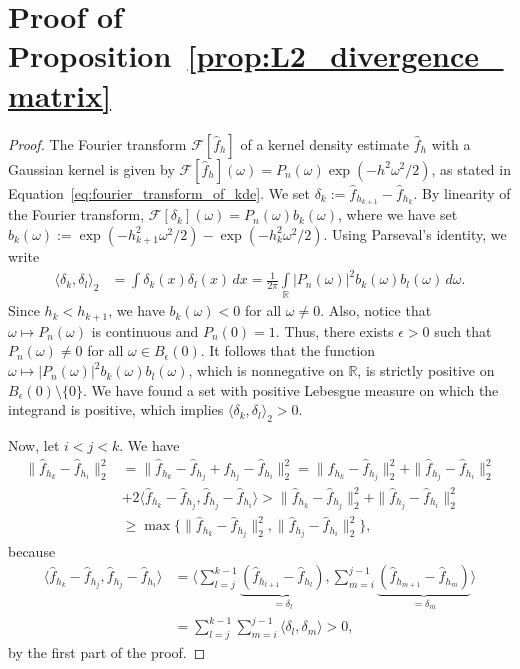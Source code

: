 \section{Proof of Proposition~\ref{prop:L2_divergence_matrix}}\label{sec:proof_L2_divergence_matrix}

\begin{proof}
    The Fourier transform $\mathcal{F}[\hat{f}_h]$ of a kernel density estimate $\hat{f}_h$ with a Gaussian kernel is given by $\mathcal{F}[\hat{f}_h](\omega)=P_n(\omega)\exp{(-h^2\omega^2/2)}$, as stated in Equation~\eqref{eq:fourier_transform_of_kde}. We set $\delta_k:=\hat{f}_{h_{k+1}}-\hat{f}_{h_k}$. By linearity of the Fourier transform, $\mathcal{F}[\delta_k](\omega)=P_n(\omega)b_k(\omega)$, where we have set $b_k(\omega):=\exp{(-h_{k+1}^2\omega^2/2)}-\exp{(-h_k^2\omega^2/2)}$. Using Parseval's identity, we write
    \begin{align*}
        \langle\delta_k,\delta_l\rangle_2&=\int\delta_k(x)\delta_l(x)\,dx=\frac{1}{2\pi}\int\limits_{\mathbb{R}}|P_n(\omega)|^2b_k(\omega)b_l(\omega)\,d\omega.
    \end{align*}
    Since $h_k<h_{k+1}$, we have $b_k(\omega)<0$ for all $\omega\ne0$. Also, notice that $\omega\mapsto P_n(\omega)$ is continuous and $P_n(0)=1$. Thus, there exists $\epsilon>0$ such that $P_n(\omega)\ne0$ for all $\omega\in B_{\epsilon}(0)$. It follows that the function $\omega\mapsto|P_n(\omega)|^2b_k(\omega)b_l(\omega)$, which is nonnegative on $\mathbb{R}$, is strictly positive on $B_{\epsilon}(0)\setminus\{0\}$. We have found a set with positive Lebesgue measure on which the integrand is positive, which implies $\langle\delta_k,\delta_l\rangle_2>0$.

    Now, let $i<j<k$. We have
    \begin{align*}
        \|\hat{f}_{h_k}-\hat{f}_{h_i}\|_2^2&=\|\hat{f}_{h_k}-\hat{f}_{h_j}+\hat{f}_{h_j}-\hat{f}_{h_i}\|_2^2=\|\hat{f}_{h_k}-\hat{f}_{h_j}\|_2^2+\|\hat{f}_{h_j}-\hat{f}_{h_i}\|_2^2\\&
        +2\langle\hat{f}_{h_k}-\hat{f}_{h_j},\hat{f}_{h_j}-\hat{f}_{h_i}\rangle>\|\hat{f}_{h_k}-\hat{f}_{h_j}\|_2^2+\|\hat{f}_{h_j}-\hat{f}_{h_i}\|_2^2\\&
        \ge\max\{\|\hat{f}_{h_k}-\hat{f}_{h_j}\|_2^2,\|\hat{f}_{h_j}-\hat{f}_{h_i}\|_2^2\},
    \end{align*}
    because
    \begin{align*}
        \langle\hat{f}_{h_k}-\hat{f}_{h_j},\hat{f}_{h_j}-\hat{f}_{h_i}\rangle&=\bigg\langle\sum_{l=j}^{k-1}\underbrace{(\hat{f}_{h_{l+1}}-\hat{f}_{h_l})}_{=\delta_l},\sum_{m=i}^{j-1}\underbrace{(\hat{f}_{h_{m+1}}-\hat{f}_{h_m})}_{=\delta_m}\bigg\rangle\\&=\sum_{l=j}^{k-1}\sum_{m=i}^{j-1}\langle\delta_l,\delta_m\rangle>0,
    \end{align*}
     by the first part of the proof.
\end{proof}

